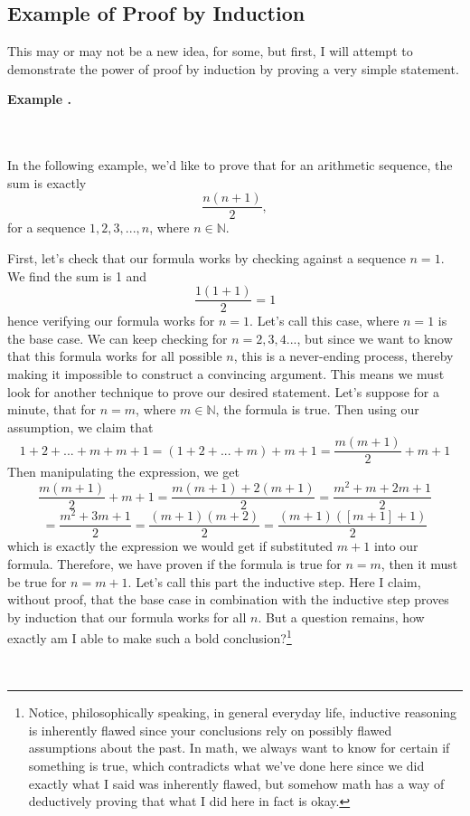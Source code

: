 \documentclass[11pt]{article}
\numberwithin{lemma}{section}
\numberwithin{equation}{section}
\numberwithin{define}{section}
\numberwithin{prop}{section}
\numberwithin{figure}{section}
\numberwithin{theorem}{section}
\newcounter{ex}[section]
\newenvironment{ex}[0]{

	\refstepcounter{ex}
	\begin{large}
    \textbf{Example \theex .}
    \end{large}\\\\
    }
    {
    \\
    }
\numberwithin{ex}{section}
\def\nat{\mathbb{N}}
\begin{document}
\subsection{Example of Proof by Induction}
This may or may not be a new idea, for some, but first, I will attempt to demonstrate the power of proof by induction by proving a very simple statement.
\begin{ex}
In the following example, we'd like to prove that for an arithmetic sequence, the sum is exactly
$$\frac{n(n+1)}{2},$$
for a sequence $1,2,3,...,n$, where $n\in\nat$. 

First, let's check that our formula works by checking against a sequence $n=1$. We find the sum is 1 and
$$\frac{1(1+1)}{2}=1$$
hence verifying our formula works for $n=1$. Let's call this case, where $n=1$ is the base case. We can keep checking for $n=2,3,4...$, but since we want to know that this formula works for all possible $n$, this is a never-ending process, thereby making it impossible to construct a convincing argument. 
This means we must look for another technique to prove our desired statement. Let's suppose for a minute, that for $n=m$, where $m\in\nat$, the formula is true. Then using our assumption, we claim that
$$1+2+...+m+m+1=(1+2+...+m)+m+1=\frac{m(m+1)}{2}+m+1$$
Then manipulating the expression, we get
$$\frac{m(m+1)}{2}+m+1=\frac{m(m+1)+2(m+1)}{2}=\frac{m^2+m+2m+1}{2}$$
$$=\frac{m^2+3m+1}{2}=\frac{(m+1)(m+2)}{2}=\frac{(m+1)([m+1]+1)}{2}$$
which is exactly the expression we would get if substituted $m+1$ into our formula. Therefore, we have proven if the formula is true for $n=m$, then it must be true for $n=m+1$. Let's call this part the inductive step.
Here I claim, without proof, that the base case in combination with the inductive step proves by induction that our formula works for all $n$. 
But a question remains, how exactly am I able to make such a bold conclusion?\footnote{Notice, philosophically speaking, in general everyday life, inductive reasoning is inherently flawed since your conclusions rely on possibly flawed assumptions about the past. 
In math, we always want to know for certain if something is true, which contradicts what we've done here since we did exactly what I said was inherently flawed, but somehow math has a way of deductively proving that what I did here in fact is okay.}
\end{ex}
\end{document}

